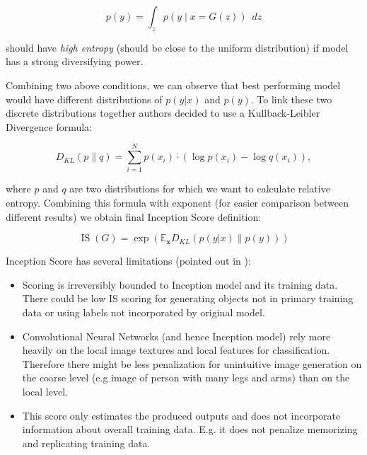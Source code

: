 \documentclass[12pt,a4paper,openany]{book}
\begin{document}
\begin{equation}
p(y) = \int_{z} p(y \mid x=G(z)) \phantom{v} dz
\end{equation}

\noindent should have \textit{high entropy} (should be close to the uniform distribution) if model has a strong diversifying power.\

\noindent Combining two above conditions, we can observe that best performing model would have different distributions of $p(y|x)$ and $p(y)$. To link these two discrete distributions together authors decided to use a Kullback-Leibler Divergence formula:

\begin{equation}
D_{K L}(p \| q)=\sum_{i=1}^{N} p\left(x_{i}\right) \cdot\left(\log p\left(x_{i}\right)-\log q\left(x_{i}\right)\right),
\end{equation}

\noindent where $p$ and $q$ are two distributions for which we want to calculate relative entropy. Combining this formula with exponent (for easier comparison between different results) we obtain final Inception Score definition:

\begin{equation}
\operatorname{IS}(G)=\exp \left(\mathbb{E}_{\mathbf{x}} D_{K L}(p(y|x) \| p(y))\right)
\end{equation}

\noindent Inception Score has several limitations (pointed out in \cite{noteonis}):

\begin{itemize}
\item Scoring is irreversibly bounded to Inception model and its training data. There could be low IS scoring for generating objects not in primary training data or using labels not incorporated by original model.
\item Convolutional Neural Networks (and hence Inception model) rely more heavily on the local image textures and local features for classification. Therefore there might be less penalization for unintuitive image generation on the coarse level (e.g image of person with many legs and arms) than on the local level.
\item This score only estimates the produced outputs and does not incorporate information about overall training data. E.g. it does not penalize memorizing and replicating training data.
\end{itemize}
\end{document}
